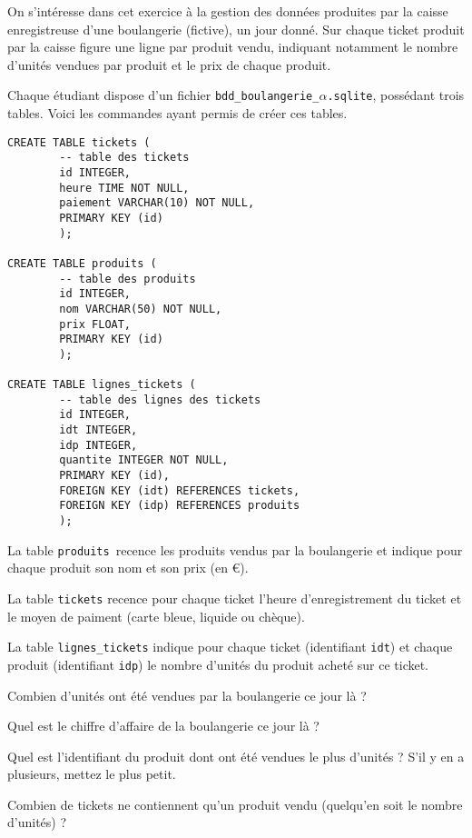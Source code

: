 On s'intéresse dans cet exercice à la gestion des données produites par la caisse enregistreuse d'une boulangerie (fictive), un jour donné. Sur chaque ticket produit par la caisse figure une ligne par produit vendu, indiquant notamment le nombre d'unités vendues par produit et le prix de chaque produit. 

Chaque étudiant dispose d'un fichier \texttt{bdd\_boulangerie\_}$\alpha$\texttt{.sqlite}, possédant trois tables. Voici les commandes ayant permis de créer ces tables. 
\begin{verbatim}
CREATE TABLE tickets (
        -- table des tickets
        id INTEGER,
        heure TIME NOT NULL,
        paiement VARCHAR(10) NOT NULL,
        PRIMARY KEY (id)
        );

CREATE TABLE produits (
        -- table des produits
        id INTEGER,
        nom VARCHAR(50) NOT NULL,
        prix FLOAT,
        PRIMARY KEY (id)
        );

CREATE TABLE lignes_tickets (
        -- table des lignes des tickets
        id INTEGER,
        idt INTEGER,
        idp INTEGER,
        quantite INTEGER NOT NULL,
        PRIMARY KEY (id),
        FOREIGN KEY (idt) REFERENCES tickets,
        FOREIGN KEY (idp) REFERENCES produits
        );
\end{verbatim}

La table \texttt{produits} recence les produits vendus par la boulangerie et indique pour chaque produit son nom et son prix (en €). 

La table \texttt{tickets} recence pour chaque ticket l'heure d'enregistrement du ticket et le moyen de paiment (carte bleue, liquide ou chèque).

La table \texttt{lignes\_tickets} indique pour chaque ticket (identifiant \texttt{idt}) et chaque produit (identifiant \texttt{idp}) le nombre d'unités du produit acheté sur ce ticket. 

\bigskip{}

\question{} Combien d'unités ont été vendues par la boulangerie ce jour là ?

\bigskip{}

\question{} Quel est le chiffre d'affaire de la boulangerie ce jour là ? 

\medskip{}

\question{} Quel est l'identifiant du produit dont ont été vendues le plus d'unités ? S'il y en a plusieurs, mettez le plus petit. 

\medskip{}

\question{} Combien de tickets ne contiennent qu'un produit vendu (quelqu'en soit le nombre d'unités) ?

